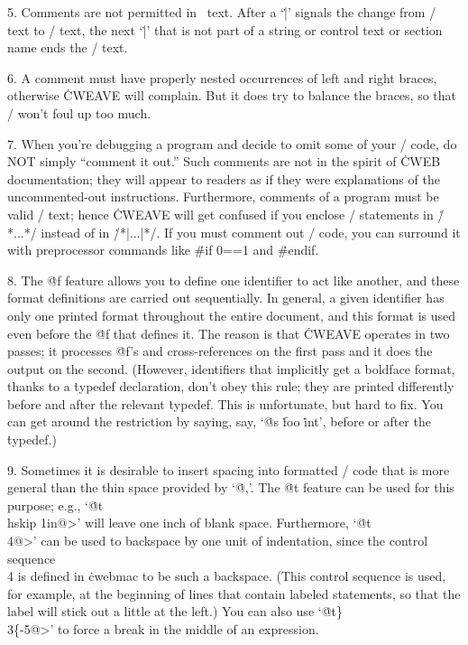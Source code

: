 5. Comments are not permitted in \pb\ text. After a `\.|'
signals the change from \TEX/ text to \CEE/ text, the next `\.|' that is
not part of a string or control text or section name ends the \CEE/ text.

6. A comment must have properly nested occurrences of left and right
braces, otherwise \.{CWEAVE} will complain. But it
does try to balance the braces, so that \TEX/ won't foul up too much.

7. When you're debugging a program and decide to omit some of your
\CEE/ code, do NOT simply ``comment it out.'' Such comments are not
in the spirit of \.{CWEB} documentation; they will appear to readers
as if they were explanations of the uncommented-out instructions.
Furthermore, comments of a program must be valid \TEX/ text; hence
\.{CWEAVE} will get confused if you enclose \CEE/ statements in
\.{/*...*/} instead of in \.{/*|...|*/}.  If you must comment out
\CEE/ code, you can surround it with preprocessor commands
like \.{\#if 0==1} and \.{\#endif}.

8. The \.{@f} feature allows you to define one identifier to act like
another, and these format definitions are carried out sequentially.
In general, a given identifier has only one printed format
throughout the entire document, and this format is used even before
the \.{@f} that defines it. The reason is that \.{CWEAVE} operates in two
passes; it processes \.{@f}'s and cross-references on the first pass and
it does the output on the second.  (However, identifiers that
implicitly get a boldface format, thanks to a \.{typedef} declaration,
don't obey this rule; they are printed differently before and after
the relevant \.{typedef}.  This is unfortunate, but hard to fix. You can
get around the restriction by saying, say, `\.{@s} \.{foo} \.{int}',
before or after the \.{typedef}.)

9. Sometimes it is desirable to insert spacing into formatted \CEE/ code that
is more general than the thin space provided by `\.{@,}'. The \.{@t} feature
can be used for this purpose; e.g., `\.{@t\\hskip 1in@>}' will
leave one inch of blank space. Furthermore, `\.{@t\\4@>}' can be
used to backspace by one unit of indentation, since the control sequence
\.{\\4} is defined in \.{cwebmac} to be such a backspace. (This
control sequence is used, for example, at the beginning of lines that
contain labeled statements, so that the label will stick out a little at
the left.) You can also use `\.{@t\}\\3\{-5@>}' to force a break
in the middle of an expression.

